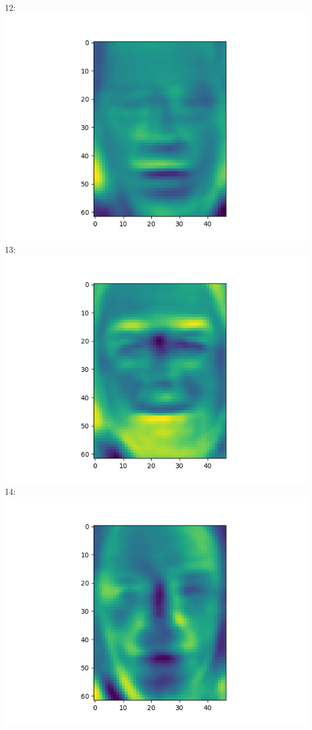 \documentclass[twoside,10pt]{article}
\theoremstyle{definition}
\theoremstyle{definition}
\theoremstyle{remark}
\renewcommand{\>}{{\rightarrow}}
\newcommand{\1}{{\mathbf 1}}
\newcommand{\0}{{\mathbf 0}}
\begin{document}
\begin{enumerate}
  12:
  \includegraphics[width=\textwidth]{eigenface_12.png}
  13:
  \includegraphics[width=\textwidth]{eigenface_13.png}
  14:
  \includegraphics[width=\textwidth]{eigenface_14.png}

\end{enumerate}
\end{document}
